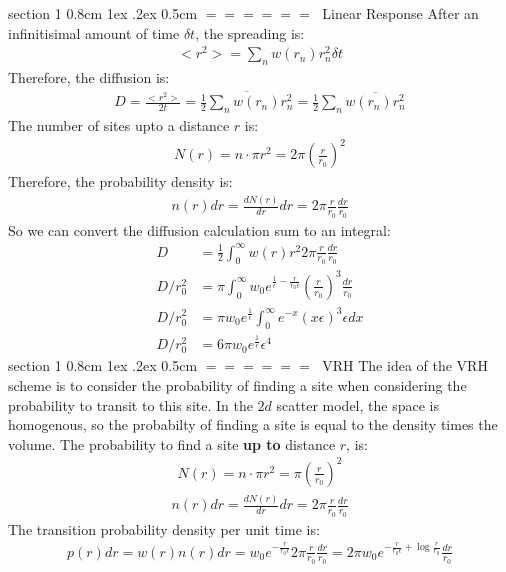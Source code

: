 \documentclass[onecolumn,fleqn,notitlepage,secnumarabic]{revtex4}
\makeatletter
\def\section{%
  \@startsection
    {section}%
    {1}%
    {\z@}%
    {0.8cm \@plus1ex \@minus .2ex}%
    {0.5cm}%
    {\Large\bf $=\!=\!=\!=\!=\!=\;$}%
}%
\makeatother
\begin{document}
\section{Linear Response}
After an infinitisimal amount of time $\delta t$, the spreading is:
\begin{align}   <r^2> = \sum_n w(r_n) r_n^2 \delta t \end{align}  
Therefore, the diffusion is:
\begin{align}   D = \frac{<r^2>}{2t} =  \overline{\frac{1}{2} \sum_n w(r_n) r_n^2} = \frac{1}{2}\sum_n \overline{w(r_n)r_n^2}\end{align}  
The number of sites upto a distance $r$ is:
\begin{align}   N(r) = n\cdot \pi r^2 = 2\pi\left(\frac{r}{r_0}\right)^2\end{align}  
Therefore, the probability density is:
\begin{align}   n(r)dr = \frac{dN(r)}{dr}dr = 2\pi \frac{r}{r_0}\frac{dr}{r_0}\end{align}  
So we can convert the diffusion calculation sum to an integral:
\begin{align} 
  D &= \frac{1}{2}\int_0^\infty w(r) r^2 2\pi \frac{r}{r_0} \frac{dr}{r_0} \\
  D/r_0^2 &= \pi \int_0^\infty w_0 e^{\frac{1}{\epsilon}-\frac{r}{r_0\epsilon}} \left(\frac{r}{r_0}\right)^3 \frac{dr}{r_0} \\
  D/r_0^2 &= \pi w_0 e^{\frac{1}{\epsilon}}\int_0^\infty  e^{-x} (x\epsilon)^3 \epsilon dx\\
  D/r_0^2 &= 6\pi w_0 e^{\frac{1}{\epsilon}}\epsilon^4 
\end{align}
\section{VRH}
The idea of the VRH scheme is to consider the probability of finding a site when considering the probability to transit to this site. In the $2d$ scatter model, the space is homogenous, so the probabilty of finding a site is equal to the density times the volume. The probability to find a site {\bf up to} distance $r$, is:
\begin{align}   N(r) = n\cdot \pi r^2 = \pi \left(\frac{r}{r_0}\right)^2\end{align}  
\begin{align}   n(r)dr = \frac{dN(r)}{dr}dr = 2\pi \frac{r}{r_0}\frac{dr}{r_0}\end{align}  
The transition probability density per unit time is:
\begin{align}  p(r)dr = w(r)n(r)dr = w_0 e^{-\frac{r}{r_0\epsilon}}2\pi \frac{r}{r_0}\frac{dr}{r_0}=2\pi w_0 e^{-\frac{r}{r_0\epsilon} + \log\frac{r}{r_0}}\frac{dr}{r_0}
\end{align}  
\end{document}
